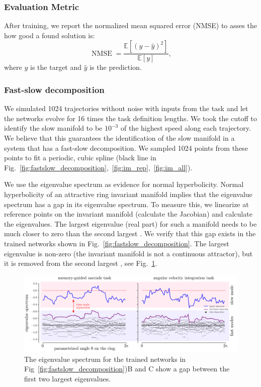 \documentclass{article} %
\newcounter{ct}
\theoremstyle{definition}
\theoremstyle{remark}
\begin{document}
\subsubsection{Evaluation Metric}
After training, we report the normalized mean squared error (NMSE) to asses the how good a found solution is:
\begin{equation}
\operatorname{NMSE} = \frac{\mathbb{E}[(y-\hat y)^2]}{\mathbb{E}[y]},
\end{equation}
where \(y\) is the target and \(\hat y\) is the prediction.


 \subsubsection{Fast-slow decomposition}\label{sec:fsdecmethod}
 We simulated 1024 trajectories without noise with inputs from the task and let the networks evolve for 16 times the task definition lengths.
 We took the cutoff to identify the slow manifold to be \(10^{-3}\) of the highest speed along each trajectory.
 We believe that this guarantees the identification of the slow manifold in a system that has a fast-slow decomposition.
 We sampled 1024 points from these points to fit a periodic, cubic spline (black line in Fig.~\ref{fig:fastslow_decomposition},~\ref{fig:im_rep},~\ref{fig:im_all}).


We use the eigenvalue spectrum as evidence for normal hyperbolicity.
Normal hyperbolicity of an attractive ring invariant manifold implies that the eigenvalue spectrum has a gap in its eigenvalue spectrum.
To measure this, we linearize at reference points on the invariant manifold (calculate the Jacobian) and calculate the eigenvalues.
The largest  eigenvalue (real part) for such a manifold needs to be much closer to zero than the second largest .
We verify that this gap exists in the trained networks shown in Fig.~\ref{fig:fastslow_decomposition}.
The largest  eigenvalue is non-zero (the invariant manifold is not a continuous attractor), but it is removed from the second largest , see Fig.~\ref{fig:eigenvalue_gap}.
\begin{figure}[tbhp]
     \centering
    \includegraphics[width=\textwidth]{eigenvalue_gap}
       \caption{The eigenvalue spectrum for the trained networks in Fig~\ref{fig:fastslow_decomposition})B and C show a gap between the first two largest eigenvalues.}
       \label{fig:eigenvalue_gap}
\end{figure}
\end{document}
